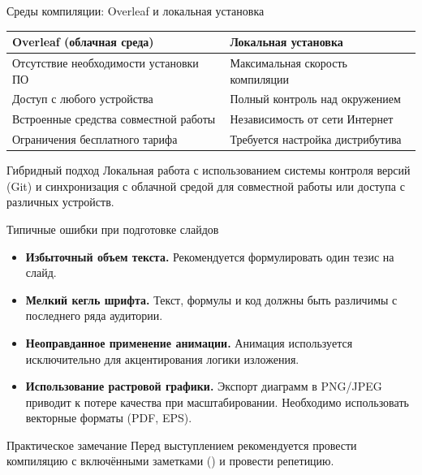 \begin{frame}[label=tools]{Среды компиляции: Overleaf и локальная установка}
  \centering
  \renewcommand{\arraystretch}{1.3}
  \begin{tabular}{@{}p{} p{}@{}}
    \toprule
    \textbf{Overleaf (облачная среда)} & \textbf{Локальная установка} \\
    \midrule
    Отсутствие необходимости установки ПО & Максимальная скорость компиляции \\
    Доступ с любого устройства & Полный контроль над окружением \\
    Встроенные средства совместной работы & Независимость от сети Интернет \\
    Ограничения бесплатного тарифа & Требуется настройка дистрибутива \\
    \bottomrule
  \end{tabular}

  \vspace{1em}
  \begin{block}{Гибридный подход}
    Локальная работа с использованием системы контроля версий (Git)
    и синхронизация с облачной средой для совместной работы или
    доступа с различных устройств.
  \end{block}
\end{frame}

\begin{frame}[label=mistakes]{Типичные ошибки при подготовке слайдов}
  \begin{itemize}
    \item \textbf{Избыточный объем текста.} Рекомендуется формулировать один тезис на слайд.
    \item \textbf{Мелкий кегль шрифта.} Текст, формулы и код должны быть различимы с последнего ряда аудитории.
    \item \textbf{Неоправданное применение анимации.} Анимация используется исключительно для акцентирования логики изложения.
    \item \textbf{Использование растровой графики.} Экспорт диаграмм в PNG/JPEG приводит к потере качества при масштабировании. Необходимо использовать векторные форматы (PDF, EPS).
  \end{itemize}

  \vspace{0.5em}
  \begin{alertblock}{Практическое замечание}
    Перед выступлением рекомендуется провести компиляцию с включёнными
    заметками () и провести репетицию.
  \end{alertblock}
\end{frame}
